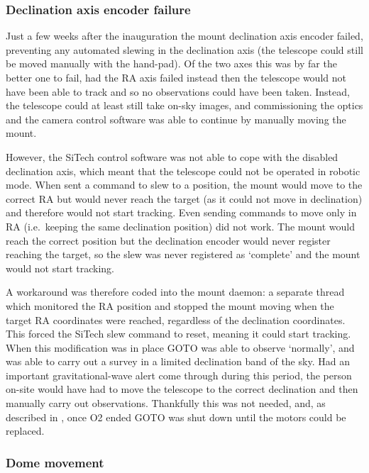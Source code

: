 \begin{colsection}
\newpage

\subsubsection{Declination axis encoder failure}

Just a few weeks after the inauguration the mount declination axis encoder failed, preventing any automated slewing in the declination axis (the telescope could still be moved manually with the hand-pad). Of the two axes this was by far the better one to fail, had the RA axis failed instead then the telescope would not have been able to track and so no observations could have been taken. Instead, the telescope could at least still take on-sky images, and commissioning the optics and the camera control software was able to continue by manually moving the mount.

However, the SiTech control software was not able to cope with the disabled declination axis, which meant that the telescope could not be operated in robotic mode. When sent a command to slew to a position, the mount would move to the correct RA but would never reach the target (as it could not move in declination) and therefore would not start tracking. Even sending commands to move only in RA (i.e.\ keeping the same declination position) did not work. The mount would reach the correct position but the declination encoder would never register reaching the target, so the slew was never registered as `complete' and the mount would not start tracking.

A workaround was therefore coded into the mount daemon: a separate thread which monitored the RA position and stopped the mount moving when the target RA coordinates were reached, regardless of the declination coordinates. This forced the SiTech slew command to reset, meaning it could start tracking. When this modification was in place GOTO was able to observe `normally', and was able to carry out a survey in a limited declination band of the sky. Had an important gravitational-wave alert come through during this period, the person on-site would have had to move the telescope to the correct declination and then manually carry out observations. Thankfully this was not needed, and, as described in , once O2 ended GOTO was shut down until the motors could be replaced.

\subsubsection{Dome movement}


\end{colsection}
